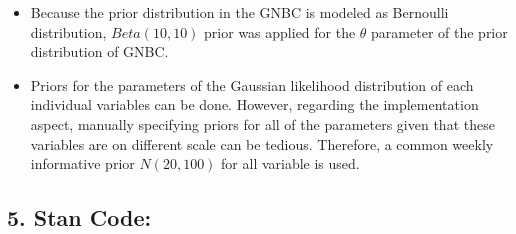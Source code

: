 \documentclass[
]{article}
\providecommand{\tightlist}{%
  \setlength{\itemsep}{0pt}\setlength{\parskip}{0pt}}
\begin{document}
\begin{itemize}
\tightlist
\item
  Because the prior distribution in the GNBC is modeled as Bernoulli
  distribution, \(Beta(10, 10)\) prior was applied for the \(\theta\)
  parameter of the prior distribution of GNBC.\\
\item
  Priors for the parameters of the Gaussian likelihood distribution of
  each individual variables can be done. However, regarding the
  implementation aspect, manually specifying priors for all of the
  parameters given that these variables are on different scale can be
  tedious. Therefore, a common weekly informative prior \(N(20, 100)\)
  for all variable is used.
\end{itemize}

\hypertarget{stan-code}{%
\subsection{5. Stan Code:}\label{stan-code}}
\end{document}
